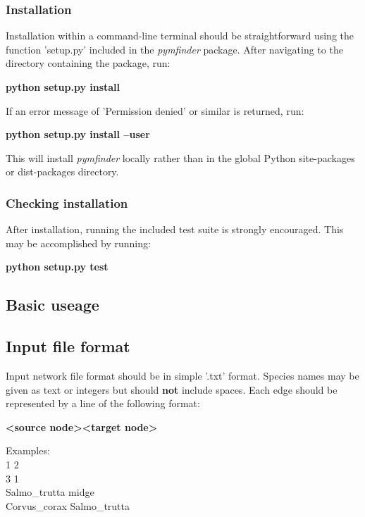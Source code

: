 \documentclass[12pt]{article}
\begin{document}
		\subsubsection{Installation}

			Installation within a command-line terminal should be straightforward using the function 'setup.py' included in the \emph{pymfinder} package. After navigating to the directory containing the package, run:

			\textbf{python setup.py install}

			If an error message of 'Permission denied' or similar is returned, run:

			\textbf{python setup.py install --user}

			This will install \emph{pymfinder} locally rather than in the global Python site-packages or dist-packages directory. 


		\subsubsection{Checking installation}

			After installation, running the included test suite is strongly encouraged. This may be accomplished by running:

			\textbf{python setup.py test}



	\subsection{Basic useage}


		\subsection{Input file format}

			Input network file format should be in simple '.txt' format. Species names may be given as text or integers but should \textbf{not} include spaces. Each edge should be represented by a line of the following format:

			\textbf{\textless source node\textgreater  \textless target node\textgreater}

			Examples:\\
			1 2\\
			3 1\\
			Salmo\_trutta midge\\
			Corvus\_corax Salmo\_trutta\\
\end{document}
